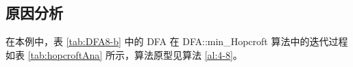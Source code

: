 

\subsection{原因分析}\label{sec:reason-hopcroft}

在本例中，表 \ref{tab:DFA8-b}  中的 DFA 在 DFA::min\_Hopcroft 算法中的迭代过程如表 \ref{tab:hopcroftAna} 所示，算法原型见算法 \ref{al:4-8}。

